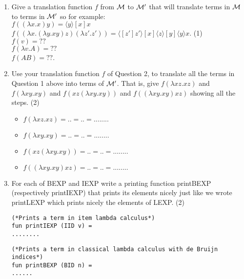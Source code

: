 \documentclass[11pt]{article}
\newcommand{\la}{\lambda}
\begin{document}
\begin{enumerate}
\begin{enumerate}
\end{enumerate}


\item
Give a translation function $f$ from ${\cal M}$ to ${\cal M'}$ that will translate terms in ${\cal M}$ to terms in ${\cal M'}$ so for example:\\
$f((\la x.x)y)= \langle y \rangle[x]x$\\
 $f((\la x.(\la y.xy)z)(\la z'.z'))= \langle[z']z' \rangle[x] \langle z \rangle[y] \langle y \rangle  x$.
 \hfill{(1)} %
 \\
   \color{red}
$f(v) = ??$\\
$f(\la v.A) = ??$\\
$f(AB) = ??$.
 \color{black}
 \item
 Use your translation function $f$ of Question 2, to translate all the terms in Question 1 above into terms of ${\cal M}'$. That is, give $f(\lambda xz.xz)$ and  $f(\lambda xy.xy)$ and $f(xz(\lambda xy.xy))$ and $f((\lambda xy.xy)xz)$ showing all the steps.
  \hfill{(2)} %

 \color{red}
 \begin{itemize}
 \item
  $f(\lambda xz.xz) = ..=..=........$
  \item
  $f(\lambda xy.xy) = ..=..=........$
  \item
  $f(xz(\lambda xy.xy))=..=..=........$
  \item
     $f((\lambda xy.xy)xz)=..=..=........$
      \end{itemize}
 \color{black}

\item
  For each of BEXP and  IEXP  write  a printing function printBEXP (respectively printIEXP) that prints its elements nicely just like we wrote  printLEXP  which prints nicely the elements of LEXP. 
\hfill{(2)} %

\color{red}
  \begin{verbatim}
(*Prints a term in item lambda calculus*)
fun printIEXP (IID v) =
........
\end{verbatim}  

 \begin{verbatim}
(*Prints a term in classical lambda calculus with de Bruijn indices*)
fun printBEXP (BID n) =
......
\end{verbatim}  



\end{enumerate}
\end{document}
